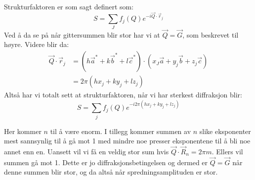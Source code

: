 \documentclass{article}
\begin{document}
\begin{minipage}{0.45\textwidth}
Strukturfaktoren er som sagt definert som: \begin{equation}
    S = \sum_J f_j (Q) e^{-i \vec{Q} \cdot \vec{r}_j}
\end{equation}
Ved å da se på når gittersummen blir stor har vi at $\vec{Q} = \vec{G}$, som beskrevet til høyre. Videre blir da:
\begin{align}
    \vec{Q} \cdot \vec{r}_j &= (h \vec{a}^{*} + k \vec{b}^{*} + l \vec{c}^{*}) \cdot(x_J \vec{a} + y_j \vec{b} + z_j \vec{c}) \\
    &= 2 \pi (h x_j + ky_j + lz_j)
\end{align}
Altså har vi totalt sett at strukturfaktoren, når vi har sterkest diffraksjon blir:
\begin{equation}
\label{eq:strukturfaktoren}
    \boxed{S = \sum_j f_j(Q) e^{-i 2 \pi (h x_j + ky_j + lz_j)}}
\end{equation}
\end{minipage}
\hfill
\begin{minipage}{0.45\textwidth}
Her kommer $n$ til å være enorm. I tillegg kommer summen av $n$ slike eksponenter mest sannsynlig til å gå mot 1 med mindre noe presser eksponentene til å bli noe annet enn en. Uansett vil vi få en veldig stor sum hvis $\vec{Q} \cdot \vec{R}_n = 2 \pi m$. Ellers vil summen gå mot 1. Dette er jo diffraksjonsbetingelsen og dermed er $\vec{Q} = \vec{G}$ når denne summen blir stor, og da altså når spredningsamplituden er stor.
\end{minipage}
\end{document}

